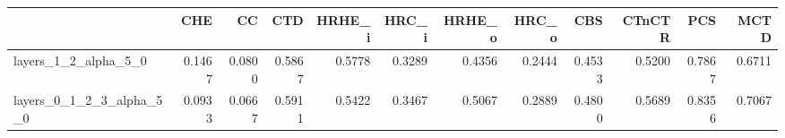 \begin{tabular}{lrrrrrrrrrrr}
\toprule
 & CHE & CC & CTD & HRHE_i & HRC_i & HRHE_o & HRC_o & CBS & CTnCTR & PCS & MCTD \\
\midrule
layers_1_2_alpha_5_0 & 0.1467 & 0.0800 & 0.5867 & 0.5778 & 0.3289 & 0.4356 & 0.2444 & 0.4533 & 0.5200 & 0.7867 & 0.6711 \\
layers_0_1_2_3_alpha_5_0 & 0.0933 & 0.0667 & 0.5911 & 0.5422 & 0.3467 & 0.5067 & 0.2889 & 0.4800 & 0.5689 & 0.8356 & 0.7067 \\
\bottomrule
\end{tabular}
